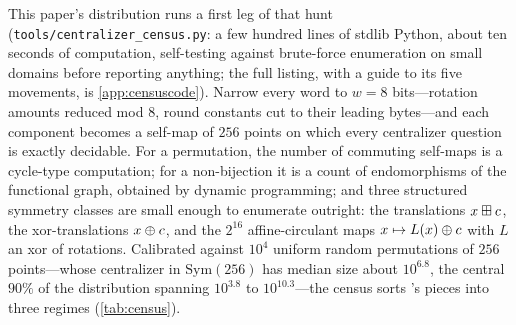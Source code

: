 This paper's distribution runs a first leg of that hunt
(\texttt{tools/centralizer\_census.py}: a few hundred lines of stdlib
Python, about ten seconds of computation, self-testing against
brute-force enumeration on small domains before reporting anything;
the full listing, with a guide to its five movements, is
\cref{app:censuscode}). Narrow every
word to $w = 8$ bits---rotation amounts reduced mod $8$, round constants
cut to their leading bytes---and each component becomes a self-map of
$256$ points on which every centralizer question is exactly decidable.
For a permutation, the number of commuting self-maps is a cycle-type
computation; for a non-bijection it is a count of endomorphisms of the
functional graph, obtained by dynamic programming; and three structured
symmetry classes are small enough to enumerate outright: the
translations $x \boxplus c$, the xor-translations $x \oplus c$, and
the $2^{16}$ affine-circulant maps $x \mapsto L(x) \oplus c$ with $L$
an xor of rotations. Calibrated against $10^{4}$ uniform random
permutations of $256$ points---whose centralizer in $\mathrm{Sym}(256)$
has median size about $10^{6.8}$, the central $90\%$ of the
distribution spanning $10^{3.8}$ to $10^{10.3}$---the census sorts
\SHA{}'s pieces into three regimes (\cref{tab:census}).

